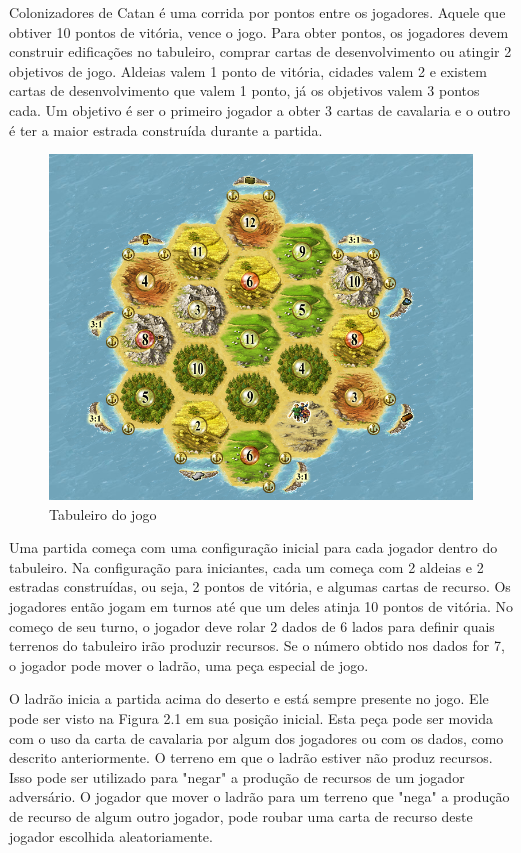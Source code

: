 Colonizadores de Catan é uma corrida por pontos entre os jogadores. Aquele que obtiver 10 pontos de vitória, vence o jogo. Para obter pontos, os jogadores devem construir edificações no tabuleiro, comprar cartas de desenvolvimento ou atingir 2 objetivos de jogo. Aldeias valem 1 ponto de vitória, cidades valem 2 e existem cartas de desenvolvimento que valem 1 ponto, já os objetivos valem 3 pontos cada. Um objetivo é ser o primeiro jogador a obter 3 cartas de cavalaria e o outro é ter a maior estrada construída durante a partida.

    \begin{figure}[H]
      \centering
      \includegraphics[width=1\textwidth]{catan.png}
      \caption{Tabuleiro do jogo}
    \end{figure}

Uma partida começa com uma configuração inicial para cada jogador dentro do tabuleiro. Na configuração para iniciantes, cada um começa com 2 aldeias e 2 estradas construídas, ou seja, 2 pontos de vitória, e algumas cartas de recurso. Os jogadores então jogam em turnos até que um deles atinja 10 pontos de vitória. No começo de seu turno, o jogador deve rolar 2 dados de 6 lados para definir quais terrenos do tabuleiro irão produzir recursos. Se o número obtido nos dados for 7, o jogador pode mover o ladrão, uma peça especial de jogo. 

O ladrão inicia a partida acima do deserto e está sempre presente no jogo. Ele pode ser visto na Figura 2.1 em sua posição inicial. Esta peça pode ser movida com o uso da carta de cavalaria por algum dos jogadores ou com os dados, como descrito anteriormente. O terreno em que o ladrão estiver não produz recursos. Isso pode ser utilizado para "negar" a produção de recursos de um jogador adversário. O jogador que mover o ladrão para um terreno que "nega" a produção de recurso de algum outro jogador, pode roubar uma carta de recurso deste jogador escolhida aleatoriamente.

